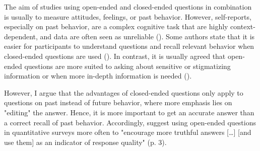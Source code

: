 \documentclass[twocolumn, issue, empirical, authordate]{jote-new-article}
\begin{document}
The aim of studies using open-ended and closed-ended questions in combination is usually to measure attitudes, feelings, or past behavior.
However, self-reports, especially on past behavior, are a complex cognitive task that are highly context-dependent, and data are often seen as unreliable (). Some authors state that it is easier for participants to understand questions and recall relevant behavior when closed-ended questions are used (). In contrast, it is usually agreed that open-ended questions are more suited to asking about sensitive or stigmatizing information or when more in-depth information is needed ().

However, I argue that the advantages of closed-ended questions only apply to questions on past instead of future behavior, where more emphasis lies on "editing" the answer. Hence, it is more important to get an accurate answer than a correct recall of past behavior.
Accordingly, \textcite{Singer2017} suggest using open-ended questions in quantitative surveys more often to "encourage more truthful answers {[}\ldots{]} {[}and use them{]} as an indicator of response quality" (p. 3).
\end{document}
